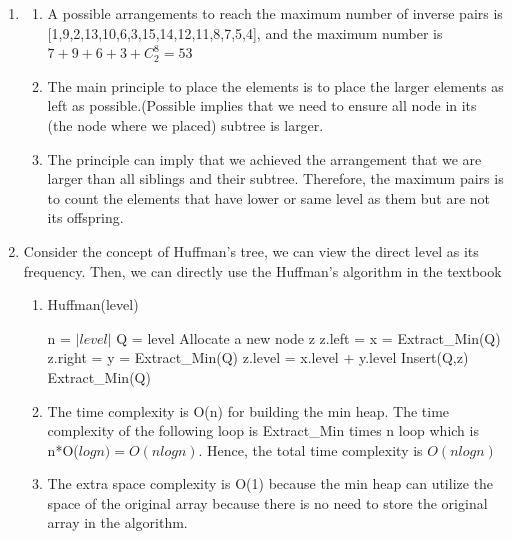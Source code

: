 \documentclass{article}
\begin{document}
\begin{CJK*}{UTF8}{bsmi}
\begin{enumerate}
    \item \begin{enumerate}
        \item A possible arrangements to reach the maximum number of inverse pairs is [1,9,2,13,10,6,3,15,14,12,11,8,7,5,4], and the maximum number is $ 7+9+6+3 + C^{8}_2 = 53$
        \item The main principle to place the elements is to place the larger elements as left as possible.(Possible implies that we need to ensure all node in its (the node where we placed) subtree is larger. 
        \item The principle can imply that we achieved the arrangement that we are larger than all siblings and their subtree. Therefore, the maximum pairs is to count the elements that have lower or same level as them but are not its offspring.
    \end{enumerate} 
    

    \item  Consider the concept of Huffman's tree, we can view the direct level as its frequency.
    Then, we can directly use the Huffman's algorithm in the textbook
    \begin{enumerate}
        \item 
        \begin{algorithm} [H]
        \caption{Huffman(level)}
        \begin{algorithmic}
        \State n = $|level|$ 
        \State Q = level 
            \State Allocate a new node z
            \State z.left = x = Extract\_Min(Q)
            \State z.right = y = Extract\_Min(Q) 
            \State z.level = x.level + y.level  
            \State Insert(Q,z)
        \EndFor
        \State \Return Extract\_Min(Q)
        \end{algorithmic}
        \end{algorithm}
        
        \item The time complexity is O(n) for building the min heap. The time complexity of the following loop is Extract\_Min times n loop which is n*O($log{n}) = O(nlog{n})$. Hence, the total time complexity is $ O(nlog{n})$ 

        \item The extra space complexity is O(1) because the min heap can utilize the space of the original array because there is no need to store the original array in the algorithm.
    \end{enumerate}


\end{enumerate}
\end{CJK*}
\end{document}
